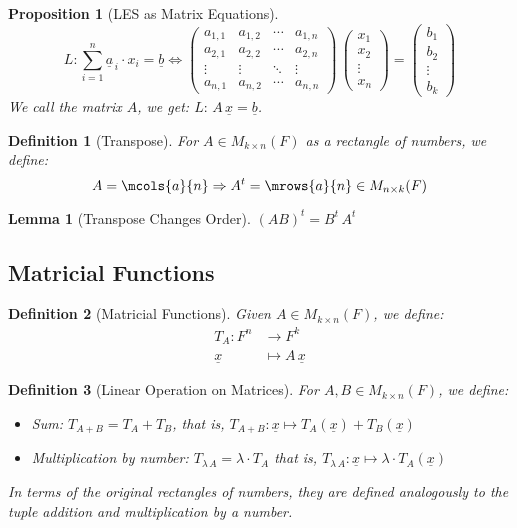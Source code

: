 \documentclass[12pt]{article}
\let\RA\Rightarrow
\let\LR\Leftrightarrow
\newcommand{\tuple}[1]{\underline{#1}}
\newtheorem{definition}{Definition}[subsection]
\newtheorem{lemma}{Lemma}[subsection]
\newtheorem{proposition}{Proposition}[subsection]
\begin{document}
\begin{proposition}[LES as Matrix Equations]
  $$
  L:\sum_{i=1}^n \tuple{a}_{\,i}\cdot x_i=\tuple{b}
  \LR
  \begin{pmatrix}
    a_{1,1}&a_{1,2}&\cdots&a_{1,n}\\
    a_{2,1}&a_{2,2}&\cdots&a_{2,n}\\
    \vdots&\vdots&\ddots&\vdots\\
    a_{n,1}&a_{n,2}&\cdots&a_{n,n}
  \end{pmatrix}
  \,\begin{pmatrix}x_1\\x_2\\\vdots\\x_n\end{pmatrix}=\begin{pmatrix}b_1\\b_2\\\vdots\\b_k\end{pmatrix}
  $$
  We call the matrix $A$, we get: $L:\,A\,\tuple{x}=\tuple{b}$.
\end{proposition}
  

\begin{definition}[Transpose]
  For $A\in M_{k\times n}(F)$ as a rectangle of numbers, we define:
  $$A=\mcols{a}{n}\RA A^t=\mrows{a}{n}\in M_{n\times k}(F)$$  
\end{definition}

\begin{lemma}[Transpose Changes Order]
  $(AB)^t=B^t\,A^t$
\end{lemma}

\subsection{Matricial Functions}

\begin{definition}[Matricial Functions]
  Given $A\in M_{k\times n}(F)$, we define:
  \begin{align*}
    T_A: F^n&\to F^k\\
    \tuple{x}&\mapsto A\,\tuple{x}
  \end{align*}
\end{definition}

\begin{definition}[Linear Operation on Matrices]
  For $A,B\in M_{k\times n}(F)$, we define:
  \begin{itemize}
    \item[] Sum: $T_{A+B}=T_A+T_B$, that is, $T_{A+B}: \tuple{x}\mapsto T_A(\tuple{x})+T_B(\tuple{x})$
    \item[] Multiplication by number: $T_{\lambda\,A}=\lambda\cdot T_A$ that is, $T_{\lambda\,A}: \tuple{x}\mapsto \lambda\cdot T_A(\tuple{x})$
  \end{itemize}
  In terms of the original rectangles of numbers, they are defined analogously to the tuple addition and multiplication by a number.
\end{definition}
\end{document}
